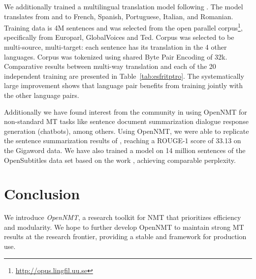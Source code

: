 \documentclass[11pt,a4paper]{article}
\begin{document}
We additionally trained a multilingual translation model following
. The model translates from and to French,
Spanish, Portuguese, Italian, and Romanian. Training data is 4M
sentences and was selected from the open parallel
corpus\footnote{\url{http://opus.lingfil.uu.se}}, specifically from
Europarl, GlobalVoices and Ted. Corpus was selected to be
multi-source, multi-target: each sentence has its translation in the 4
other languages. Corpus was tokenized using shared Byte
Pair Encoding of 32k.  Comparative results between multi-way
translation and each of the 20 independent training are presented in
Table~\ref{tab:esfritptro}. The systematically large improvement shows
that language pair benefits from training jointly with the other language pairs.

Additionally we have found interest from the community in using
OpenNMT for non-standard MT tasks like sentence document summarization
dialogue response generation (chatbots), among others.  Using
OpenNMT, we were able to replicate the sentence summarization results
of \citet{chopra2016abstractive}, reaching a ROUGE-1 score of 33.13 on
the Gigaword data. We have also trained a model on 14 million
sentences of the OpenSubtitles data set based on the work
\citet{vinyals2015neural}, achieving comparable perplexity.













\section{Conclusion}

We introduce \textit{OpenNMT}, a research toolkit for NMT that
prioritizes efficiency and modularity. We hope to further develop
OpenNMT to maintain strong MT results at the research frontier, 
providing a stable and framework for production use.

\newpage 



\begin{small}



  
\end{small}
\end{document}
